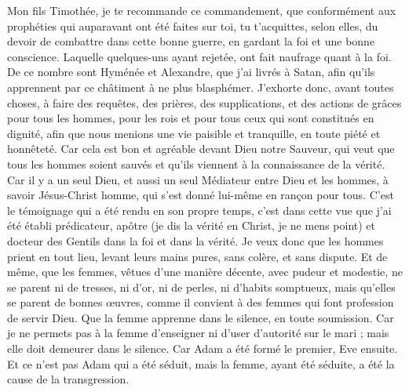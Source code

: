 \begin{multicols}{2}
Mon fils Timothée, je te recommande ce commandement, que conformément aux prophéties qui auparavant ont été faites sur toi, tu t'acquittes, selon elles, du devoir de combattre dans cette bonne guerre,
en gardant la foi et une bonne conscience. Laquelle quelques-uns ayant rejetée, ont fait naufrage quant à la foi.
De ce nombre sont Hyménée et Alexandre, que j'ai livrés à Satan, afin qu'ils apprennent par ce châtiment à ne plus blasphémer.
\VerseOne{}J'exhorte donc, avant toutes choses, à faire des requêtes, des prières, des supplications, et des actions de grâces pour tous les hommes,
pour les rois et pour tous ceux qui sont constitués en dignité, afin que nous menions une vie paisible et tranquille, en toute piété et honnêteté.
Car cela est bon et agréable devant Dieu notre Sauveur,
qui veut que tous les hommes soient sauvés et qu'ils viennent à la connaissance de la vérité.
Car il y a un seul Dieu, et aussi un seul Médiateur entre Dieu et les hommes, à savoir Jésus-Christ homme,
qui s'est donné lui-même en rançon pour tous. C'est le témoignage qui a été rendu en son propre temps,
c'est dans cette vue que j'ai été établi prédicateur, apôtre (je dis la vérité en Christ, je ne mens point) et docteur des Gentils dans la foi et dans la vérité.
Je veux donc que les hommes prient en tout lieu, levant leurs mains pures, sans colère, et sans dispute.
Et de même, que les femmes, vêtues d'une manière décente, avec pudeur et modestie, ne se parent ni de tresses, ni d'or, ni de perles, ni d'habits somptueux,
mais qu'elles se parent de bonnes œuvres, comme il convient à des femmes qui font profession de servir Dieu.
Que la femme apprenne dans le silence, en toute soumission.
Car je ne permets pas à la femme d'enseigner ni d'user d'autorité sur le mari ; mais elle doit demeurer dans le silence.
Car Adam a été formé le premier, Eve ensuite.
Et ce n'est pas Adam qui a été séduit, mais la femme, ayant été séduite, a été la cause de la transgression.

\end{multicols}
